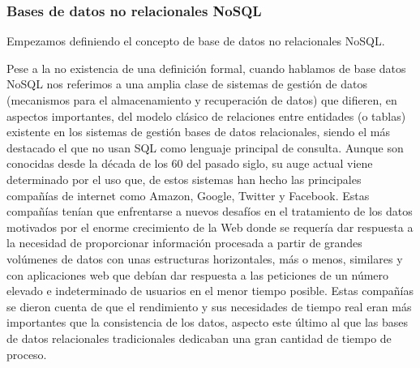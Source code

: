 \subsubsection{Bases de datos no relacionales NoSQL}

Empezamos definiendo el concepto de base de datos no relacionales NoSQL.

Pese a la no existencia de una definición formal, cuando hablamos de base datos NoSQL nos referimos a una amplia clase de sistemas de gestión de datos (mecanismos para el almacenamiento y recuperación de datos) que difieren, en aspectos importantes, del modelo clásico de relaciones entre entidades (o tablas) existente en los sistemas de gestión bases de datos relacionales, siendo el más destacado el que no usan SQL como lenguaje principal de consulta.
Aunque son conocidas desde la década de los 60 del pasado siglo, su auge actual viene determinado por el uso que, de estos sistemas han hecho las principales compañías de internet como Amazon, Google, Twitter y Facebook. Estas compañías tenían que enfrentarse a nuevos desafíos en el tratamiento de los datos motivados por el enorme crecimiento de la Web donde se requería dar respuesta a la necesidad de proporcionar información procesada a partir de grandes volúmenes de datos con unas estructuras horizontales, más o menos, similares y con aplicaciones web que debían dar respuesta a las peticiones de un número elevado e indeterminado de usuarios en el menor tiempo posible. Estas compañías se dieron cuenta de que el rendimiento y sus necesidades de tiempo real eran más importantes que la consistencia de los datos, aspecto este último al que las bases de datos relacionales tradicionales dedicaban una gran cantidad de tiempo de proceso.

